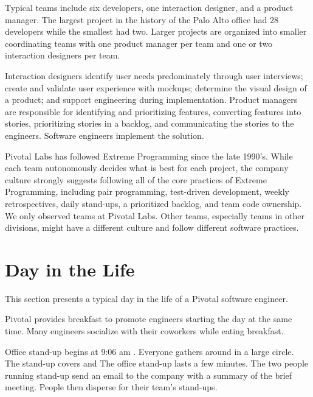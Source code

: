 Typical teams include six developers, one interaction designer, and a product manager. The largest project in the history of the Palo Alto office had 28 developers while the smallest had two. Larger projects are organized into smaller coordinating teams with one product manager per team and one or two interaction designers per team.

Interaction designers identify user needs predominately through user interviews; create and validate user experience with mockups; determine the visual design of a product; and support engineering during implementation. Product managers are responsible for identifying and prioritizing features, converting features into stories, prioritizing stories in a backlog, and communicating the stories to the engineers. Software engineers implement the solution. 

Pivotal Labs has followed Extreme Programming \cite{BeckExtremeProgramming2004} since the late 1990's. While each team autonomously decides what is best for each project, the company culture strongly suggests following all of the core practices of Extreme Programming, including pair programming, test-driven development, weekly retrospectives, daily stand-ups, a prioritized backlog, and team code ownership. We only observed teams at Pivotal Labs. Other teams, especially teams in other divisions, might have a different culture and follow different software practices.

\section{Day in the Life}
This section presents a typical day in the life of a Pivotal software engineer.

Pivotal provides breakfast to promote engineers starting the day at the same time. Many engineers socialize with their coworkers while eating breakfast. 

Office stand-up begins at 9:06 am \cite{BBCPivotal9am}. Everyone gathers around in a large circle. The stand-up covers    and  The office stand-up lasts a few minutes. The two people running stand-up send an email to the company with a summary of the brief meeting. People then disperse for their team’s stand-ups.

